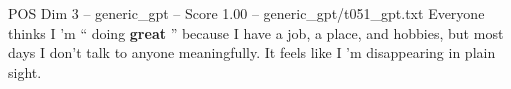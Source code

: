 \begin{textsample}{POS Dim 3 – generic\_gpt – Score 1.00 – generic\_gpt/t051\_gpt.txt}  \label{ex:f3_pos_039}
Everyone thinks I ’m “ doing \textbf{great} ” because I have a job, a place, and hobbies, but most days I don't talk to anyone meaningfully.
It feels like I ’m disappearing in plain sight.

\end{textsample}
